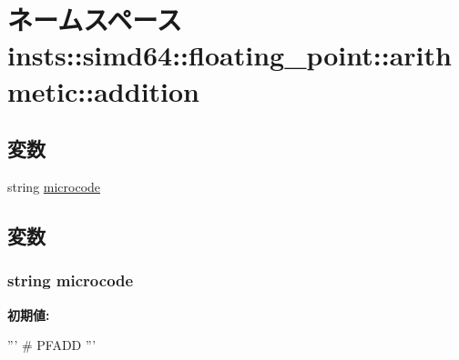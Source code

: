 \hypertarget{namespaceinsts_1_1simd64_1_1floating__point_1_1arithmetic_1_1addition}{
\section{ネームスペース insts::simd64::floating\_\-point::arithmetic::addition}
\label{namespaceinsts_1_1simd64_1_1floating__point_1_1arithmetic_1_1addition}
}
\subsection*{変数}
\begin{DoxyCompactItemize}
\item 
string \hyperlink{namespaceinsts_1_1simd64_1_1floating__point_1_1arithmetic_1_1addition_a770f11a173e99389a8802f0107ed8f52}{microcode}
\end{DoxyCompactItemize}


\subsection{変数}
\hypertarget{namespaceinsts_1_1simd64_1_1floating__point_1_1arithmetic_1_1addition_a770f11a173e99389a8802f0107ed8f52}{
\subsubsection[{microcode}]{\setlength{\rightskip}{0pt plus 5cm}string {\bf microcode}}}
\label{namespaceinsts_1_1simd64_1_1floating__point_1_1arithmetic_1_1addition_a770f11a173e99389a8802f0107ed8f52}
{\bfseries 初期値:}
\begin{DoxyCode}
'''
# PFADD
'''
\end{DoxyCode}
